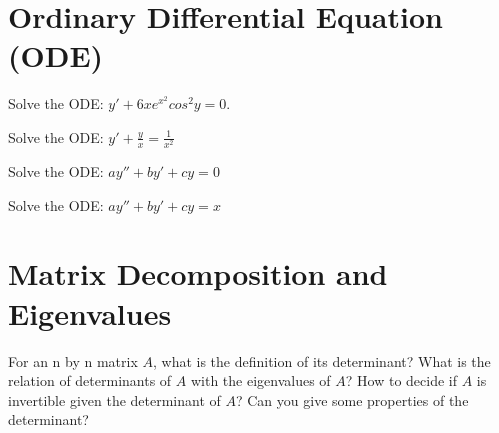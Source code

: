 \section{Ordinary Differential Equation (ODE)}
\begin{exe}[Separable]
Solve the ODE: $y'+6xe^{x^2}cos^2y =0$.
\end{exe}
\begin{teacher}
\begin{sol}
\end{sol}
\end{teacher}

\begin{exe}
Solve the ODE: $y'+\frac{y}{x}=\frac{1}{x^2}$
\end{exe}
\begin{teacher}
\begin{sol}
\end{sol}
\end{teacher}


\begin{exe}[Homogeneous]
Solve the ODE: $ay''+by'+cy=0$
\end{exe}
\begin{teacher}
\begin{sol}
\end{sol}
\end{teacher}


\begin{exe}
Solve the ODE: $ay''+by'+cy=x$
\end{exe}
\begin{teacher}
\begin{sol}
\end{sol}
\end{teacher}

\section{Matrix Decomposition and Eigenvalues}
\begin{exe}[Determinant]
For an n by n matrix $A$, what is the definition of its determinant? What is the relation of determinants of $A$ with the eigenvalues of $A$? How to decide if $A$ is invertible given the determinant of $A$? Can you give some properties of the determinant?
\end{exe}
\begin{teacher}
\begin{sol}
\end{sol}
\end{teacher}

